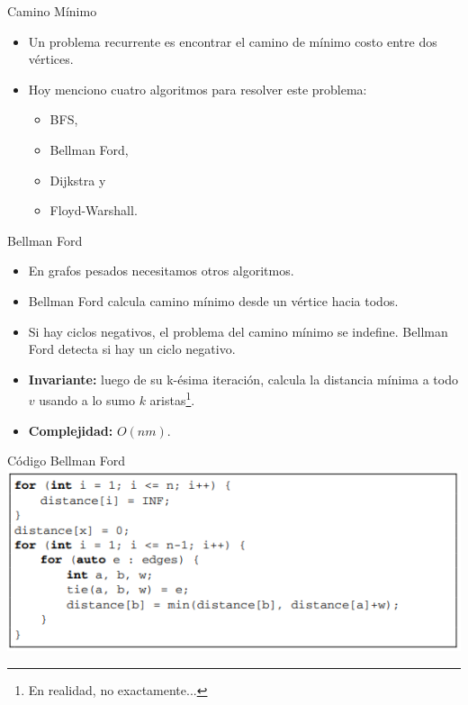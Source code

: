 \documentclass{beamer}
\begin{document}
\begin{frame}{Camino Mínimo}
	\begin{itemize}
		\item Un problema recurrente es encontrar el camino de mínimo costo entre dos vértices.
		\item Hoy menciono cuatro algoritmos para resolver este problema:
		\begin{itemize}
			\item BFS,
			\item Bellman Ford,
			\item Dijkstra y
			\item Floyd-Warshall.
		\end{itemize}
	\end{itemize}
\end{frame}

\begin{frame}{Bellman Ford}
	\begin{itemize}
		\item En grafos pesados necesitamos otros algoritmos.
		\item Bellman Ford calcula camino mínimo desde un vértice hacia todos.
		\item Si hay ciclos negativos, el problema del camino mínimo se indefine. Bellman Ford detecta si hay un ciclo negativo.
		\item \textbf{Invariante:} luego de su k-ésima iteración, calcula la distancia mínima a todo $v$ usando a lo sumo $k$ aristas\footnote{En realidad, no exactamente...}.
		\item \textbf{Complejidad:} $O(nm)$.
	\end{itemize}
\end{frame}

\begin{frame}{Código Bellman Ford}
	\centering
	\includegraphics[]{figuras/bellman_ford.PNG}
\end{frame}
\end{document}
